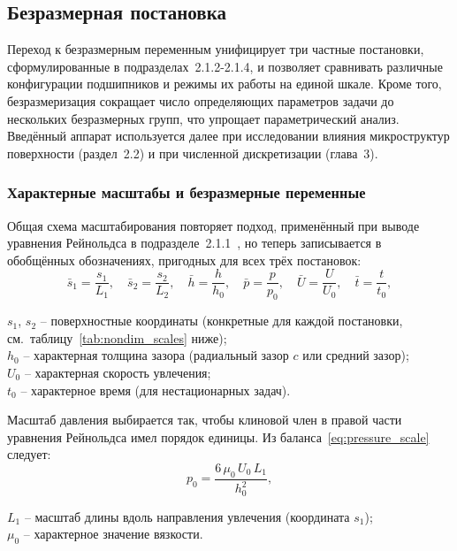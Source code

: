 \subsection{Безразмерная постановка}

Переход к безразмерным переменным унифицирует три частные постановки, сформулированные в подразделах~2.1.2-2.1.4, и позволяет сравнивать различные конфигурации подшипников и режимы их работы на единой шкале. Кроме того, безразмеризация сокращает число определяющих параметров задачи до нескольких безразмерных групп, что упрощает параметрический анализ. Введённый аппарат используется далее при исследовании влияния микроструктур поверхности (раздел~2.2) и при численной дискретизации (глава~3).

\subsubsection*{Характерные масштабы и безразмерные переменные}

Общая схема масштабирования повторяет подход, применённый при выводе уравнения Рейнольдса в подразделе~2.1.1~\cite{hori2002,szeri1998}, но теперь записывается в обобщённых обозначениях, пригодных для всех трёх постановок:
%
\begin{equation}
\bar{s}_1 = \frac{s_1}{L_1}, \quad
\bar{s}_2 = \frac{s_2}{L_2}, \quad
\bar{h}   = \frac{h}{h_0},   \quad
\bar{p}   = \frac{p}{p_0},   \quad
\bar{U}   = \frac{U}{U_0},   \quad
\bar{t}   = \frac{t}{t_0},
\label{eq:nondim_vars}
\end{equation}
%
\begin{conditions}
$s_1$, $s_2$ -- поверхностные координаты (конкретные для каждой постановки, см.\ таблицу~\ref{tab:nondim_scales} ниже);\\
$h_0$ -- характерная толщина зазора (радиальный зазор $c$ или средний зазор);\\
$U_0$ -- характерная скорость увлечения;\\
$t_0$ -- характерное время (для нестационарных задач).
\end{conditions}
Масштаб давления выбирается так, чтобы клиновой член в правой части уравнения Рейнольдса имел порядок единицы. Из баланса~\eqref{eq:pressure_scale} следует:
%
\begin{equation}
p_0 = \frac{6\,\mu_0\,U_0\,L_1}{h_0^2},
\label{eq:nondim_p0}
\end{equation}
%
\begin{conditions}
$L_1$ -- масштаб длины вдоль направления увлечения (координата $s_1$);\\
$\mu_0$ -- характерное значение вязкости.
\end{conditions}

